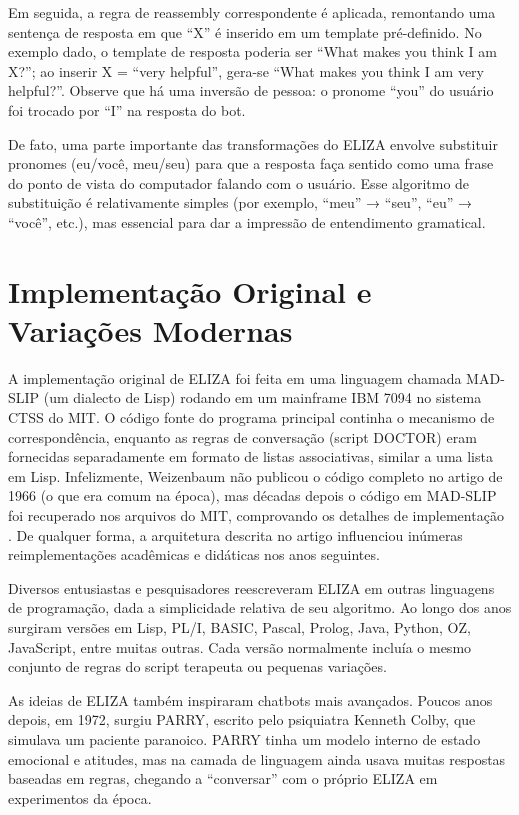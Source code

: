 \documentclass[14pt,a4paper,oneside]{book}
\begin{document}
Em seguida, a regra de reassembly correspondente é aplicada, remontando uma sentença de resposta em que “X” é inserido em um template pré-definido. No exemplo dado, o template de resposta poderia ser “What makes you think I am X?”; ao inserir X = “very helpful”, gera-se “What makes you think I am very helpful?”. Observe que há uma inversão de pessoa: o pronome “you” do usuário foi trocado por “I” na resposta do bot.

De fato, uma parte importante das transformações do ELIZA envolve substituir pronomes (eu/você, meu/seu) para que a resposta faça sentido como uma frase do ponto de vista do computador falando com o usuário. Esse algoritmo de substituição é relativamente simples (por exemplo, “meu” → “seu”, “eu” → “você”, etc.), mas essencial para dar a impressão de entendimento gramatical.

\section{Implementação Original e Variações Modernas}

A implementação original de ELIZA foi feita em uma linguagem chamada MAD-SLIP (um dialecto de Lisp) rodando em um mainframe IBM 7094 no sistema CTSS do MIT. O código fonte do programa principal continha o mecanismo de correspondência, enquanto as regras de conversação (script DOCTOR) eram fornecidas separadamente em formato de listas associativas, similar a uma lista em Lisp. Infelizmente, Weizenbaum não publicou o código completo no artigo de 1966 (o que era comum na época), mas décadas depois o código em MAD-SLIP foi recuperado nos arquivos do MIT, comprovando os detalhes de implementação \cite{Lane2025}. De qualquer forma, a arquitetura descrita no artigo influenciou inúmeras reimplementações acadêmicas e didáticas nos anos seguintes.

Diversos entusiastas e pesquisadores reescreveram ELIZA em outras linguagens de programação, dada a simplicidade relativa de seu algoritmo. Ao longo dos anos surgiram versões em Lisp, PL/I, BASIC, Pascal, Prolog, Java, Python, OZ, JavaScript, entre muitas outras. Cada versão normalmente incluía o mesmo conjunto de regras do script terapeuta ou pequenas variações.

As ideias de ELIZA também inspiraram chatbots mais avançados. Poucos anos depois, em 1972, surgiu PARRY, escrito pelo psiquiatra Kenneth Colby, que simulava um paciente paranoico. PARRY tinha um modelo interno de estado emocional e atitudes, mas na camada de linguagem ainda usava muitas respostas baseadas em regras, chegando a “conversar” com o próprio ELIZA em experimentos da época.
\end{document}
